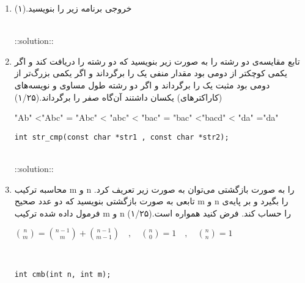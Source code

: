 \documentclass[12pt, a4paper]{article}
\begin{document}
\begin{enumerate}
\item
خروجی برنامه زیر را بنویسید.(۱)

\begin{latin}

\end{latin}

\begin{latin}
\\
::solution:: \\

\end{latin}

\item
تابع مقایسه‌ی دو رشته را به صورت زیر بنویسید که دو رشته را دریافت کند و اگر یکمی
  کوچکتر از دومی
بود مقدار منفی یک را برگرداند و اگر یکمی بزرگ‌تر از دومی بود مثبت یک را برگرداند و اگر دو رشته طول مساوی و نویسه‌های (کاراکترهای)
یکسان داشتند آن‌گاه صفر را برگرداند.(۱/۲۵)
\\
\begin{latin}
"Ab" <"Abc" = "Abc" < "abc" < "bac" = "bac" <"bacd" < "da" ="da"  \\
\begin{lstlisting}[numbers=none] 
int str_cmp(const char *str1 , const char *str2);
\end{lstlisting}
\end{latin}

\begin{latin}
\\
::solution:: \\

\end{latin}

\item
محاسبه ترکیب m و n را به صورت بازگشتی می‌توان به صورت
زیر
تعریف کرد. تابعی به صورت بازگشتی بنویسید که دو عدد صحیح m و n را بگیرد و بر پایه‌ی فرمول داده شده ترکیب m و n را حساب کند. فرض کنید همواره  
است.(۱/۲۵)
\\
\begin{latin}
\begin{math}
\binom{n}{m} = \binom{n-1}{m} + \binom{n-1}{m-1} \quad , 
  \quad \binom{n}{0} = 1 \quad , \quad \binom{n}{n} = 1 
\end{math}
\end{latin}
\\

\begin{latin}
\begin{lstlisting}[numbers=none] 
int cmb(int n, int m);
\end{lstlisting}
\end{latin}


\end{enumerate}
\end{document}
